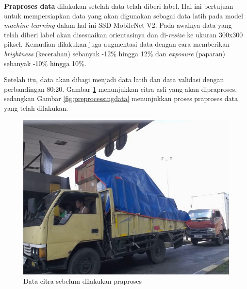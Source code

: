 \textbf{Praproses data} dilakukan setelah data telah diberi label. Hal ini bertujuan untuk mempersiapkan data yang akan digunakan sebagai data latih pada model \emph{machine learning} dalam hal ini SSD-MobileNet-V2. Pada awalnya data yang telah diberi label akan disesuaikan orientasinya dan di-\emph{resize} ke ukuran 300x300 piksel. Kemudian dilakukan juga augmentasi data dengan cara memberikan \emph{brightness} (kecerahan) sebanyak -12\% hingga 12\% dan \emph{exposure} (paparan) sebanyak -10\% hingga 10\%.

Setelah itu, data akan dibagi menjadi data latih dan data validasi dengan perbandingan 80:20. Gambar \ref{fig:citraasli} menunjukkan citra asli yang akan dipraproses, sedangkan Gambar \ref{fig:preprocessingdata} menunjukkan proses praproses data yang telah dilakukan.

\begin{figure}[h]
  \centering

  \includegraphics[scale=0.5]{gambar/bab3-citra-asli.jpg}
  \caption{Data citra sebelum dilakukan praproses}
  \label{fig:citraasli}
  
\end{figure}

